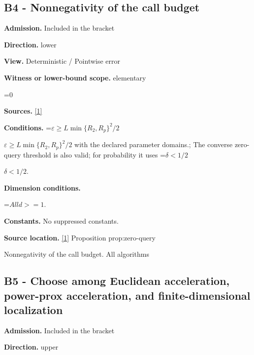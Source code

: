 \documentclass[10pt,a4paper]{article}
\newcommand{\AtlasMath}[1]{\par\begingroup\centering\setbox0=\hbox{$\displaystyle #1$}\ifdim\wd0>1.4\linewidth\typeout{ATLAS WIDE FORMULA: \the\wd0}\fi\ifdim\wd0>\linewidth\resizebox{\linewidth}{!}{\box0}\else\box0\fi\par\endgroup}
\newcommand{\AtlasInlineMath}[1]{\begingroup\setbox0=\hbox{$#1$}\ifdim\wd0>.4\linewidth\endgroup\AtlasMath{#1}\else\endgroup$#1$\fi}
\begin{document}
\subsection{B4 - Nonnegativity of the call budget}


\textbf{Admission.} Included in the bracket



\textbf{Direction.} lower



\textbf{View.} Deterministic / Pointwise error



\textbf{Witness or lower-bound scope.} elementary



\AtlasMath{0}


\textbf{Sources.} \href{https://github.com/WU-Wendao/Colombo/blob/main/colombo_sensorium/Complexity_altas/data/sources/colombo/U02/manuscript.pdf}{[1]}



\textbf{Conditions.} \AtlasInlineMath{\varepsilon\ge L\min\{R_2,R_p\}^2/2} with the declared parameter domains.; The converse zero-query threshold is also valid; for probability it uses \AtlasInlineMath{\delta<1/2}.



\textbf{Dimension conditions.}



\AtlasMath{All d>=1.}


\textbf{Constants.} No suppressed constants.



\textbf{Source location.} \href{https://github.com/WU-Wendao/Colombo/blob/main/colombo_sensorium/Complexity_altas/data/sources/colombo/U02/manuscript.pdf}{[1]} Proposition prop:zero-query



Nonnegativity of the call budget. All algorithms



\subsection{B5 - Choose among Euclidean acceleration, power-prox acceleration, and finite-dimensional localization}


\textbf{Admission.} Included in the bracket



\textbf{Direction.} upper
\end{document}
